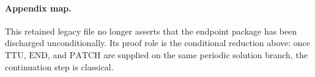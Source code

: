 \paragraph{Appendix map.}
This retained legacy file no longer asserts that the endpoint package has been
discharged unconditionally.  Its proof role is the conditional reduction above:
once \(\mathrm{TTU}\), \(\mathrm{END}\), and \(\mathrm{PATCH}\) are supplied on
the same periodic solution branch, the continuation step is classical.
